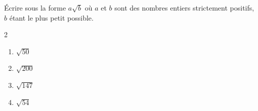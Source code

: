 \begin{exo}{}
	Écrire sous la forme $a\sqrt{b}$ où $a$ et $b$ sont des nombres entiers strictement positifs, $b$ étant le plus petit possible.
	\vspace*{-2mm}\begin{multicols}{2}
		\begin{enumerate}[itemsep=2mm]
			\item $\sqrt{50}$
			\item $\sqrt{200}$
			\item $\sqrt{147}$
			\item $\sqrt{54}$
		\end{enumerate}
	\end{multicols}\vspace*{-2mm}
\end{exo}
